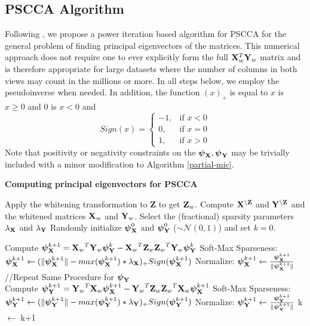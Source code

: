 \documentclass{llncs}
\newcommand{\X}{{\bf X}}
\newcommand{\Y}{{\bf Y}}
\newcommand{\Z}{{\bf Z}}
\newcommand{\bs}{\boldsymbol}
\begin{document}

\subsection{PSCCA Algorithm}
Following \cite{golub}, we propose a power iteration based algorithm
for PSCCA for the general problem of finding principal eigenvectors of
the matrices.  This numerical approach does not require one to ever
explicitly form the full $\X_{w}^T \Y_{w}$ matrix and is therefore
appropriate for large datasets where the number of columns in both views may
count in the millions or more.  In all steps below, we employ the
pseudoinverse when needed.  In addition, the function $(x)_+$ is equal to $x$ is $x \geq 0$ and $0$ is $x <0$ and 
 \begin{equation}
Sign(x)= \begin{cases} -1, & \mbox{if } x<0 \\0, & \mbox{if } x=0 \\1, & \mbox{if } x>0 \end{cases}
\end{equation}
Note that positivity or negativity constraints on the
$\bs\psi_{\X}, \bs\psi_{\Y}$ may be trivially included with a minor
modification to Algorithm \ref{partial-mic}.
\vspace{-0.1in}
\begin{algorithm}[htdp]
\small \caption{\bf Computing principal eigenvectors for PSCCA}
\label{partial-mic}
\begin{algorithmic}[1]
\STATE Apply the whitening transformation to {\Z} to get $\Z_{w}$.
\STATE Compute $\X^{\backslash \Z}$ and $\Y^{\backslash \Z}$ and the whitened matrices $\X_{w}$ and $\Y_{w}$. 
\STATE Select the (fractional) sparsity parameters $\lambda_{\X}$ and $\lambda_{\Y}$
\STATE Randomly initialize $\bs \psi_{\X}^0$ and $\bs \psi_{\Y}^0$ ($\sim \mathcal{N}(0,1)$) and set $k=0$.

\WHILE {$\Delta$ Corr($\bs X_w \bs \psi_{\X}^{k+1}$, $\bs Y_w \bs \psi_{\Y}^{k+1}$) $<$ $\epsilon$}
\STATE Compute  $\bs \psi_{\X}^{k+1}= {\X_w}^T {\Y_w} \bs \psi_{\Y}^{k} -  {\X_w}^T  {\Z_w} {\Z_w}^T {\Y_w} \bs \psi_{\Y}^{k}$
\STATE Soft-Max Sparseness:  $\bs \psi_{\X}^{k+1} \leftarrow (\|\bs \psi_{\X}^{k+1}\|  - max(\bs \psi_{\X}^{k+1})*\lambda_{\X})_+ Sign(\bs \psi_{\X}^{k+1})$
\STATE Normalize: $\bs \psi_{\X}^{k+1} \leftarrow \frac{\bs \psi_{\X}^{k+1}}{\|\bs \psi_{\X}^{k+1}\|}$\\
//Repeat Same Procedure for $\bs \psi_{\Y}$ \\
\STATE Compute  $\bs \psi_{\Y}^{k+1}= {\Y_w}^T {\X_w} \bs \psi_{\X}^{k+1} -  {\Y_w}^T  {\Z_w} {\Z_w}^T {\X_w} \bs \psi_{\X}^{k+1}$
\STATE Soft-Max Sparseness: $\bs \psi_{\Y}^{k+1} \leftarrow (\|\bs \psi_{\Y}^{k+1}\|  - max(\bs \psi_{\Y}^{k+1})*\lambda_{\Y})_+ Sign(\bs \psi_{\Y}^{k+1})$
\STATE Normalize: $\bs \psi_{\Y}^{k+1} \leftarrow \frac{\bs \psi_{\Y}^{k+1}}{\|\bs \psi_{\Y}^{k+1}\|}$
\STATE k $\leftarrow$ k+1
\ENDWHILE
\end{algorithmic}
\end{algorithm}
\end{document}
